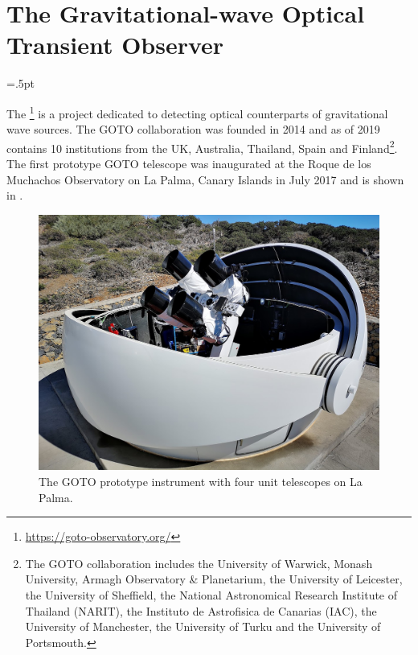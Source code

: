 \clearpage
\newpage
\hfuzz=6pt %
\section{The Gravitational-wave Optical Transient Observer}
\hfuzz=.5pt %
\label{sec:goto}
\begin{colsection}


\begin{colsection}

The \footnote{\url{https://goto-observatory.org/}} is a project dedicated to detecting optical counterparts of gravitational wave sources. The GOTO collaboration was founded in 2014 and as of 2019 contains 10 institutions from the UK, Australia, Thailand, Spain and Finland\footnote{The GOTO collaboration includes the University of Warwick, Monash University, Armagh Observatory \& Planetarium, the University of Leicester, the University of Sheffield, the National Astronomical Research Institute of Thailand (NARIT), the Instituto de Astrofisica de Canarias (IAC), the University of Manchester, the University of Turku and the University of Portsmouth.}. The first prototype GOTO telescope was inaugurated at the Roque de los Muchachos Observatory on La Palma, Canary Islands in July 2017 and is shown in .

\begin{figure}[p]
    \begin{center}
        \includegraphics[width=0.9\linewidth]{images/goto_photo.jpg}
    \end{center}
    \caption[The GOTO prototype instrument]{
        The GOTO prototype instrument with four unit telescopes on La Palma.
    }\label{fig:goto_photo}
\end{figure}


\end{colsection}
\end{colsection}
